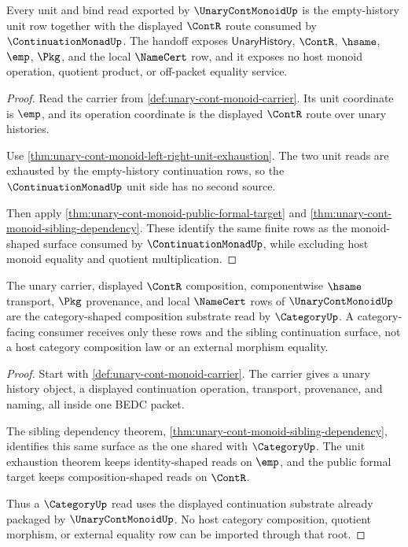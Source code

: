 \begin{theorem}
\label{thm:unary-cont-monoid-continuationmonad-unit-handoff}
Every unit and bind read exported by $\UnaryContMonoidUp$ is the empty-history unit row together with the displayed $\ContR$ route consumed by $\ContinuationMonadUp$. The handoff exposes $\mathsf{UnaryHistory}$, $\ContR$, $\hsame$, $\emp$, $\Pkg$, and the local $\NameCert$ row, and it exposes no host monoid operation, quotient product, or off-packet equality service.
\end{theorem}
\begin{proof}
Read the carrier from \autoref{def:unary-cont-monoid-carrier}. Its unit coordinate is $\emp$, and its operation coordinate is the displayed $\ContR$ route over unary histories.

Use \autoref{thm:unary-cont-monoid-left-right-unit-exhaustion}. The two unit reads are exhausted by the empty-history continuation rows, so the $\ContinuationMonadUp$ unit side has no second source.

Then apply \autoref{thm:unary-cont-monoid-public-formal-target} and \autoref{thm:unary-cont-monoid-sibling-dependency}. These identify the same finite rows as the monoid-shaped surface consumed by $\ContinuationMonadUp$, while excluding host monoid equality and quotient multiplication.
\end{proof}

\begin{theorem}
\label{thm:unary-cont-monoid-category-root-readiness}
The unary carrier, displayed $\ContR$ composition, componentwise $\hsame$ transport, $\Pkg$ provenance, and local $\NameCert$ rows of $\UnaryContMonoidUp$ are the category-shaped composition substrate read by $\CategoryUp$. A category-facing consumer receives only these rows and the sibling continuation surface, not a host category composition law or an external morphism equality.
\end{theorem}
\begin{proof}
Start with \autoref{def:unary-cont-monoid-carrier}. The carrier gives a unary history object, a displayed continuation operation, transport, provenance, and naming, all inside one BEDC packet.

The sibling dependency theorem, \autoref{thm:unary-cont-monoid-sibling-dependency}, identifies this same surface as the one shared with $\CategoryUp$. The unit exhaustion theorem keeps identity-shaped reads on $\emp$, and the public formal target keeps composition-shaped reads on $\ContR$.

Thus a $\CategoryUp$ read uses the displayed continuation substrate already packaged by $\UnaryContMonoidUp$. No host category composition, quotient morphism, or external equality row can be imported through that root.
\end{proof}

